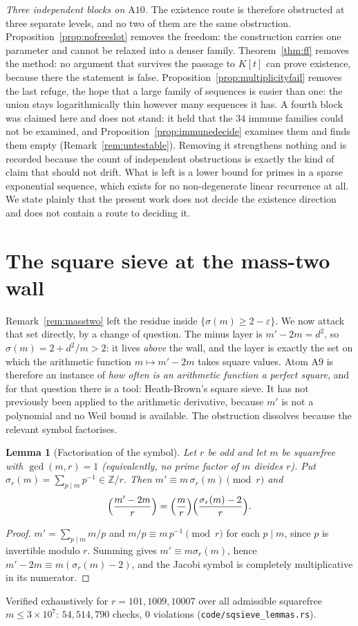 \documentclass[11pt]{article}
\newtheorem{lemma}[theorem]{Lemma}
\theoremstyle{definition}
\begin{document}
\emph{Three independent blocks on $\mathrm{A}10$.} The existence route is therefore obstructed at three separate levels, and no two of them are the
same obstruction. Proposition~\ref{prop:nofreeslot} removes the freedom: the construction carries
one parameter and cannot be relaxed into a denser family. Theorem~\ref{thm:ff} removes the
method: no argument that survives the passage to $K[t]$ can prove existence, because there the
statement is false. Proposition~\ref{prop:multiplicityfail} removes the last refuge, the hope that a
large family of sequences is easier than one: the union stays logarithmically thin however many
sequences it has. A fourth block was claimed here and does not stand: it held that the $34$ immune
families could not be examined, and Proposition~\ref{prop:immunedecide} examines them and finds them
empty (Remark~\ref{rem:untestable}). Removing it strengthens nothing and is recorded because the
count of independent obstructions is exactly the kind of claim that should not drift.
What is left is a lower bound for primes in a sparse exponential sequence, which exists for no
non-degenerate linear recurrence at all. We state plainly that the present work does not decide the
existence direction and does not contain a route to deciding it.


\section{The square sieve at the mass-two wall}\label{sec:sqsieve}

Remark~\ref{rem:masstwo} left the residue inside $\{\sigma(m)\ge2-\varepsilon\}$. We now attack that
set directly, by a change of question. The minus layer is $m'-2m=d^2$, so $\sigma(m)=2+d^2/m>2$:
it lives \emph{above} the wall, and the layer is exactly the set on which the arithmetic function
$m\mapsto m'-2m$ takes square values. Atom $\mathrm{A}9$ is therefore an instance of
\emph{how often is an arithmetic function a perfect square}, and for that question there is a tool:
Heath-Brown's square sieve. It has not previously been applied to the arithmetic derivative,
because $m'$ is not a polynomial and no Weil bound is available. The obstruction dissolves because
the relevant symbol factorises.

\begin{lemma}[Factorisation of the symbol]\label{lem:symbolfact}
Let $r$ be odd and let $m$ be squarefree with $\gcd(m,r)=1$ \textup{(}equivalently, no prime factor
of $m$ divides $r$\textup{)}.
Put $\sigma_r(m)=\sum_{p\mid m}p^{-1}\in\mathbb{Z}/r$. Then $m'\equiv m\,\sigma_r(m)\pmod r$ and
\[ \Bigl(\frac{m'-2m}{r}\Bigr)=\Bigl(\frac{m}{r}\Bigr)\Bigl(\frac{\sigma_r(m)-2}{r}\Bigr). \]
\end{lemma}
\begin{proof}
$m'=\sum_{p\mid m}m/p$ and $m/p\equiv m\,p^{-1}\pmod r$ for each $p\mid m$, since $p$ is invertible
modulo $r$. Summing gives $m'\equiv m\sigma_r(m)$, hence $m'-2m\equiv m(\sigma_r(m)-2)$, and the
Jacobi symbol is completely multiplicative in its numerator.
\end{proof}
Verified exhaustively for $r=101,1009,10007$ over all admissible squarefree $m\le3\times10^7$:
$54{,}514{,}790$ checks, $0$ violations \textup{(\texttt{code/sqsieve\_lemmas.rs})}.
\end{document}
